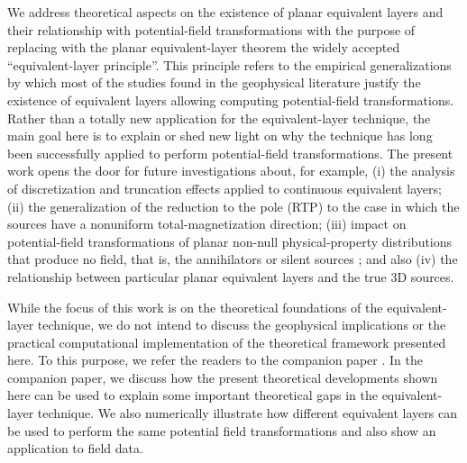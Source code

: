 We address theoretical aspects on the existence of planar equivalent layers and their 
relationship with potential-field transformations with the purpose of replacing with the 
planar equivalent-layer theorem the widely accepted ``equivalent-layer principle''. 
This principle refers to the 
empirical generalizations by which most of the studies found in the geophysical literature 
justify the existence of equivalent layers allowing computing potential-field transformations. 
Rather than a totally new application for the equivalent-layer technique, the main goal here 
is to explain or shed new light on why the technique has long been successfully applied to 
perform potential-field transformations. 
The present work opens the door for future investigations about, for example,  
(i) the analysis of discretization and truncation effects applied to continuous equivalent 
layers; 
(ii) the generalization of the reduction to the pole (RTP) 
to the case in which the sources have a nonuniform total-magnetization direction;
(iii) impact on potential-field transformations of planar non-null physical-property 
distributions that produce no field, that is, the annihilators \cite[][ p. 66]{parker1994} or 
silent sources \citep{baratchart2013, baratchart_etal2021}; and also 
(iv) the relationship between particular planar equivalent layers and the true 3D sources.

While the focus of this work is on the theoretical foundations of the equivalent-layer technique, 
we do not intend to discuss the geophysical implications or the practical computational implementation 
of the theoretical framework presented here. 
To this purpose, we refer the readers to the companion paper \citep{oliveirajr_etal2026_2}. 
In the companion paper, we discuss how the present theoretical developments shown here can be 
used to explain some important theoretical gaps in the equivalent-layer technique. 
We also numerically illustrate how different equivalent layers can be used 
to perform the same potential field transformations and also show an application to field data. 